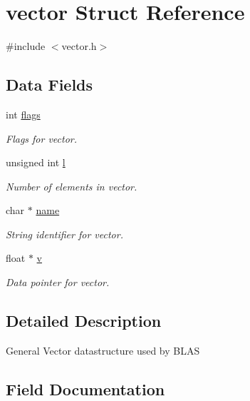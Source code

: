 \hypertarget{structvector}{}\section{vector Struct Reference}
\label{structvector}


{\ttfamily \#include $<$vector.\+h$>$}

\subsection*{Data Fields}
\begin{DoxyCompactItemize}
\item 
int \hyperlink{structvector_ae4c86a32c9c70758bf4556732ded4137}{flags}
\begin{DoxyCompactList}\small\item\em Flags for vector. \end{DoxyCompactList}\item 
unsigned int \hyperlink{structvector_a95c5d324db1053c979145cea94d5263e}{l}
\begin{DoxyCompactList}\small\item\em Number of elements in vector. \end{DoxyCompactList}\item 
char $\ast$ \hyperlink{structvector_aa03a1f4dcbfcd7b3f2e3393234dbc4a2}{name}
\begin{DoxyCompactList}\small\item\em String identifier for vector. \end{DoxyCompactList}\item 
float $\ast$ \hyperlink{structvector_acfc0ef4d07bb980f28ce9a55e70ed074}{v}
\begin{DoxyCompactList}\small\item\em Data pointer for vector. \end{DoxyCompactList}\end{DoxyCompactItemize}


\subsection{Detailed Description}
General Vector datastructure used by B\+L\+AS 

\subsection{Field Documentation}
\mbox{\label{structvector_ae4c86a32c9c70758bf4556732ded4137}} 
